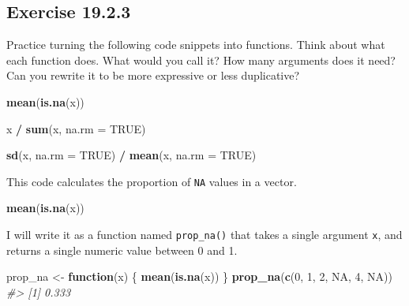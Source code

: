 \documentclass[]{book}
\newenvironment{Shaded}{\begin{snugshade}}{\end{snugshade}}
\newcommand{\CommentTok}[1]{\textcolor[rgb]{0.56,0.35,0.01}{\textit{#1}}}
\newcommand{\ControlFlowTok}[1]{\textcolor[rgb]{0.13,0.29,0.53}{\textbf{#1}}}
\newcommand{\DataTypeTok}[1]{\textcolor[rgb]{0.13,0.29,0.53}{#1}}
\newcommand{\DecValTok}[1]{\textcolor[rgb]{0.00,0.00,0.81}{#1}}
\newcommand{\KeywordTok}[1]{\textcolor[rgb]{0.13,0.29,0.53}{\textbf{#1}}}
\newcommand{\NormalTok}[1]{#1}
\newcommand{\OperatorTok}[1]{\textcolor[rgb]{0.81,0.36,0.00}{\textbf{#1}}}
\newcommand{\OtherTok}[1]{\textcolor[rgb]{0.56,0.35,0.01}{#1}}
\newcommand{\StringTok}[1]{\textcolor[rgb]{0.31,0.60,0.02}{#1}}
\theoremstyle{plain}
\theoremstyle{remark}
\theoremstyle{definition}
\theoremstyle{definition}
\theoremstyle{definition}
\theoremstyle{remark}
\begin{document}
\hypertarget{exercise-19.2.3}{%
\subsection*{\texorpdfstring{Exercise
{19.2.3}}{Exercise 19.2.3}}\label{exercise-19.2.3}}

Practice turning the following code snippets into functions. Think about
what each function does. What would you call it? How many arguments does
it need? Can you rewrite it to be more expressive or less duplicative?

\begin{Shaded}
\begin{Highlighting}[]
\KeywordTok{mean}\NormalTok{(}\KeywordTok{is.na}\NormalTok{(x))}

\NormalTok{x }\OperatorTok{/}\StringTok{ }\KeywordTok{sum}\NormalTok{(x, }\DataTypeTok{na.rm =} \OtherTok{TRUE}\NormalTok{)}

\KeywordTok{sd}\NormalTok{(x, }\DataTypeTok{na.rm =} \OtherTok{TRUE}\NormalTok{) }\OperatorTok{/}\StringTok{ }\KeywordTok{mean}\NormalTok{(x, }\DataTypeTok{na.rm =} \OtherTok{TRUE}\NormalTok{)}
\end{Highlighting}
\end{Shaded}

This code calculates the proportion of \texttt{NA} values in a vector.

\begin{Shaded}
\begin{Highlighting}[]
\KeywordTok{mean}\NormalTok{(}\KeywordTok{is.na}\NormalTok{(x))}
\end{Highlighting}
\end{Shaded}

I will write it as a function named \texttt{prop\_na()} that takes a
single argument \texttt{x}, and returns a single numeric value between 0
and 1.

\begin{Shaded}
\begin{Highlighting}[]
\NormalTok{prop_na <-}\StringTok{ }\ControlFlowTok{function}\NormalTok{(x) \{}
  \KeywordTok{mean}\NormalTok{(}\KeywordTok{is.na}\NormalTok{(x))}
\NormalTok{\}}
\KeywordTok{prop_na}\NormalTok{(}\KeywordTok{c}\NormalTok{(}\DecValTok{0}\NormalTok{, }\DecValTok{1}\NormalTok{, }\DecValTok{2}\NormalTok{, }\OtherTok{NA}\NormalTok{, }\DecValTok{4}\NormalTok{, }\OtherTok{NA}\NormalTok{))}
\CommentTok{#> [1] 0.333}
\end{Highlighting}
\end{Shaded}
\end{document}
